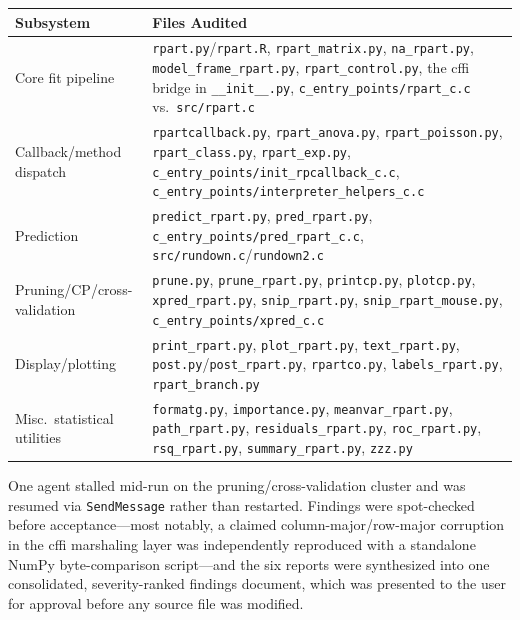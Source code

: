 \documentclass[12pt]{article}
\begin{document}
\medskip
\begin{center}
\begin{tabular}{p{}p{}}
\toprule
Subsystem & Files Audited \\
\midrule
Core fit pipeline & \texttt{rpart.py}/\texttt{rpart.R}, \texttt{rpart\_matrix.py}, \texttt{na\_rpart.py}, \texttt{model\_frame\_rpart.py}, \texttt{rpart\_control.py}, the cffi bridge in \texttt{\_\_init\_\_.py}, \texttt{c\_entry\_points/rpart\_c.c} vs.\ \texttt{src/rpart.c} \\
Callback/method dispatch & \texttt{rpartcallback.py}, \texttt{rpart\_anova.py}, \texttt{rpart\_poisson.py}, \texttt{rpart\_class.py}, \texttt{rpart\_exp.py}, \texttt{c\_entry\_points/init\_rpcallback\_c.c}, \texttt{c\_entry\_points/interpreter\_helpers\_c.c} \\
Prediction & \texttt{predict\_rpart.py}, \texttt{pred\_rpart.py}, \texttt{c\_entry\_points/pred\_rpart\_c.c}, \texttt{src/rundown.c}/\texttt{rundown2.c} \\
Pruning/CP/cross-validation & \texttt{prune.py}, \texttt{prune\_rpart.py}, \texttt{printcp.py}, \texttt{plotcp.py}, \texttt{xpred\_rpart.py}, \texttt{snip\_rpart.py}, \texttt{snip\_rpart\_mouse.py}, \texttt{c\_entry\_points/xpred\_c.c} \\
Display/plotting & \texttt{print\_rpart.py}, \texttt{plot\_rpart.py}, \texttt{text\_rpart.py}, \texttt{post.py}/\texttt{post\_rpart.py}, \texttt{rpartco.py}, \texttt{labels\_rpart.py}, \texttt{rpart\_branch.py} \\
Misc.\ statistical utilities & \texttt{formatg.py}, \texttt{importance.py}, \texttt{meanvar\_rpart.py}, \texttt{path\_rpart.py}, \texttt{residuals\_rpart.py}, \texttt{roc\_rpart.py}, \texttt{rsq\_rpart.py}, \texttt{summary\_rpart.py}, \texttt{zzz.py} \\
\bottomrule
\end{tabular}
\end{center}
\medskip

One agent stalled mid-run on the pruning/cross-validation cluster and was resumed via \texttt{SendMessage} rather than restarted. Findings were spot-checked before acceptance---most notably, a claimed column-major/row-major corruption in the cffi marshaling layer was independently reproduced with a standalone NumPy byte-comparison script---and the six reports were synthesized into one consolidated, severity-ranked findings document, which was presented to the user for approval before any source file was modified.
\end{document}
